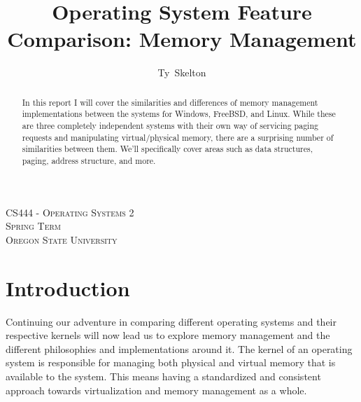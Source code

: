 \documentclass[10pt,draftclsnofoot,onecolumn]{IEEEtran}
\begin{document}
\singlespacing %
\title{Operating System Feature Comparison: Memory Management}

\author{Ty~Skelton}

\maketitle

\begin{abstract}
In this report I will cover the similarities and differences of memory management implementations between the systems for Windows, FreeBSD, and Linux.
While these are three completely independent systems with their own way of servicing paging requests and manipulating virtual/physical memory, there are a surprising number of similarities between them.
We'll specifically cover areas such as data structures, paging, address structure, and more.
\end{abstract}

\begin{center}
\scshape %
CS444 - Operating Systems 2 \\  %
Spring Term\\[\baselineskip]    %
Oregon State University\par     %
\end{center}

\IEEEpeerreviewmaketitle

\newpage
{}
\tableofcontents
\newpage

\section{Introduction}
\label{sec:Introduction}
\par Continuing our adventure in comparing different operating systems and their respective kernels will now lead us to explore memory management and the different philosophies and implementations around it.
The kernel of an operating system is responsible for managing both physical and virtual memory that is available to the system.
This means having a standardized and consistent approach towards virtualization and memory management as a whole.

\end{document}
